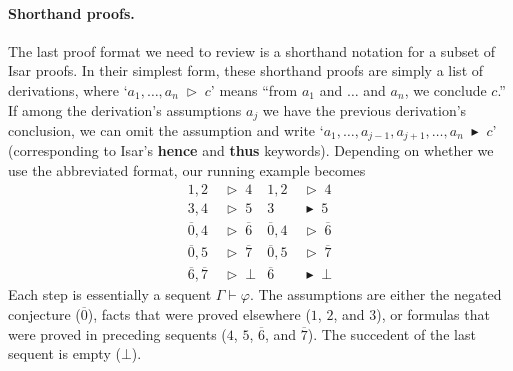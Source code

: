 \documentclass[withtimes,a4paper,12pt]{easychair}
\newcommand\keyw[1]{\textsf{\textbf{#1}}}
\let\B=\overline
\newcommand\have{\mathrel{\;\vartriangleright\;}}
\newcommand\hence{\mathrel{\;\blacktriangleright\;}}
\begin{document}
\paragraph{Shorthand proofs.}
The last proof format we need to review is a shorthand notation for a subset of
Isar proofs. In their simplest form, these shorthand proofs are simply a list of
derivations, where `$a_1, \ldots, a_n \have c$' means ``from $a_1$ and $\ldots$
and $a_n$, we conclude $c$.'' If among the derivation's assumptions $a_j$
we have the previous derivation's conclusion, we can omit the assumption
and write `$a_1, \ldots, a_{j-1}, a_{j+1}, \ldots, a_n \hence c$' (corresponding
to Isar's \keyw{hence} and \keyw{thus} keywords). Depending on whether we use
the abbreviated format, our running example becomes
%
\begin{align*}
1, 2 & \have 4 &
    1, 2 & \have 4 \\
3, 4 & \have 5 &
    3 & \hence 5 \\
\B{0}, 4 & \have \B{6} &
    \B{0}, 4 & \have \B{6} \\
\B{0}, 5 & \have \B{7} &
    \B{0}, 5 & \have \B{7} \\
\B{6}, \B{7} & \have \bot &
    \B{6} & \hence \bot
\end{align*}
%
Each step is essentially a sequent $\Gamma \vdash \varphi$. The assumptions are
either the negated conjecture ($\B{0}$), facts that were proved elsewhere ($1$,
$2$, and $3$), or formulas that were proved in preceding sequents ($4$, $5$,
$\B{6}$, and $\B{7}$). The succedent of the last sequent is empty ($\bot$).
\end{document}
